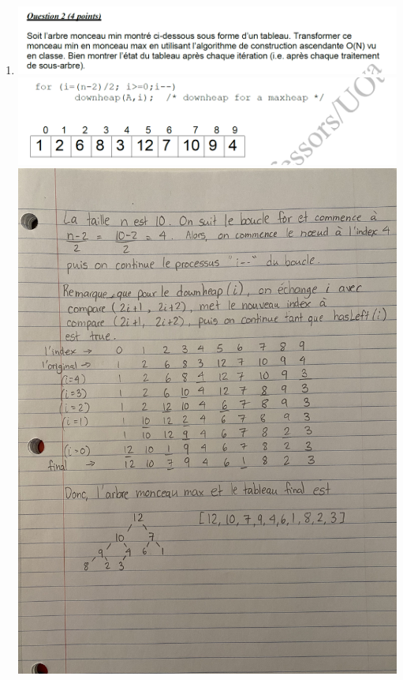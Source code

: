 \documentclass[12pt]{book}
\begin{document}
\begin{enumerate}
    \item 
    
    \includegraphics[scale=0.5]{q2question.png}\\
    \includegraphics[scale=0.5]{q2question2.png}\\
    \includegraphics[scale=0.13]{q2answer.png}
    
    \newpage
    

\end{enumerate}
\end{document}
